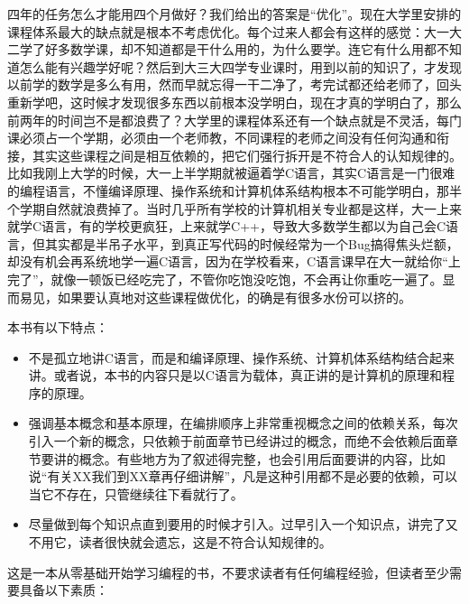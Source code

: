 四年的任务怎么才能用四个月做好？我们给出的答案是“优化”。现在大学里安排的课程体系最大的缺点就是根本不考虑优化。每个过来人都会有这样的感觉：大一大二学了好多数学课，却不知道都是干什么用的，为什么要学。连它有什么用都不知道怎么能有兴趣学好呢？然后到大三大四学专业课时，用到以前的知识了，才发现以前学的数学是多么有用，然而早就忘得一干二净了，考完试都还给老师了，回头重新学吧，这时候才发现很多东西以前根本没学明白，现在才真的学明白了，那么前两年的时间岂不是都浪费了？大学里的课程体系还有一个缺点就是不灵活，每门课必须占一个学期，必须由一个老师教，不同课程的老师之间没有任何沟通和衔接，其实这些课程之间是相互依赖的，把它们强行拆开是不符合人的认知规律的。比如我刚上大学的时候，大一上半学期就被逼着学C语言，其实C语言是一门很难的编程语言，不懂编译原理、操作系统和计算机体系结构根本不可能学明白，那半个学期自然就浪费掉了。当时几乎所有学校的计算机相关专业都是这样，大一上来就学C语言，有的学校更疯狂，上来就学C++，导致大多数学生都以为自己会C语言，但其实都是半吊子水平，到真正写代码的时候经常为一个Bug搞得焦头烂额，却没有机会再系统地学一遍C语言，因为在学校看来，C语言课早在大一就给你“上完了”，就像一顿饭已经吃完了，不管你吃饱没吃饱，不会再让你重吃一遍了。显而易见，如果要认真地对这些课程做优化，的确是有很多水份可以挤的。



本书有以下特点：


\begin{itemize}

\item 不是孤立地讲C语言，而是和编译原理、操作系统、计算机体系结构结合起来讲。或者说，本书的内容只是以C语言为载体，真正讲的是计算机的原理和程序的原理。

\item 强调基本概念和基本原理，在编排顺序上非常重视概念之间的依赖关系，每次引入一个新的概念，只依赖于前面章节已经讲过的概念，而绝不会依赖后面章节要讲的概念。有些地方为了叙述得完整，也会引用后面要讲的内容，比如说“有关XX我们到XX章再仔细讲解”，凡是这种引用都不是必要的依赖，可以当它不存在，只管继续往下看就行了。

\item 尽量做到每个知识点直到要用的时候才引入。过早引入一个知识点，讲完了又不用它，读者很快就会遗忘，这是不符合认知规律的。
\end{itemize}


这是一本从零基础开始学习编程的书，不要求读者有任何编程经验，但读者至少需要具备以下素质：


